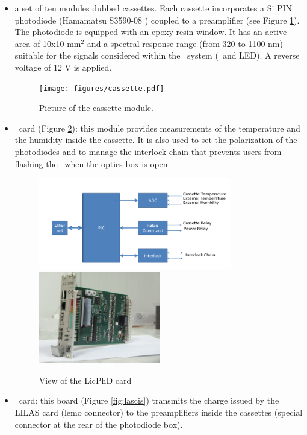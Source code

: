 \begin{itemize}
\item a set of ten modules dubbed cassettes. Each cassette incorporates a Si PIN photodiode (Hamamatsu S3590-08 \cite{ref:photodiode}) coupled to a preamplifier (see Figure  \ref{fig:cassette}). The photodiode is equipped with an epoxy resin window. It has an active area of 10x10 mm$^{2}$ and a spectral response range (from 320 to 1100 nm) suitable for the signals considered within the \laserii~system (\laser~and LED). A reverse voltage of 12 V is applied.

\begin{figure}[htbp]
\centering
\texttt{[image: figures/cassette.pdf]}
\caption{Picture of the cassette module.}\label{fig:cassette}
\end{figure}

\item \licphd~card (Figure \ref{fig:laslicphd}): this module provides measurements of  the temperature and the humidity inside the cassette. It is also used to set the polarization of the photodiodes and to
manage the interlock chain that prevents users from flashing the \laser~when the optics box is open.

\begin{figure}[htbp]
\centering
\includegraphics[height=4cm]{figures/licphd_scheme.pdf}
\includegraphics[height=4cm]{figures/licphd.JPG}
\caption{View of the LicPhD card}\label{fig:laslicphd}
\end{figure}

\item \charinjsplit~card: this board (Figure \ref{fig:lascis}) transmits the charge issued by the LILAS card (lemo connector) to the preamplifiers inside the cassettes (special connector at the rear of the photodiode box). 




\end{itemize}
